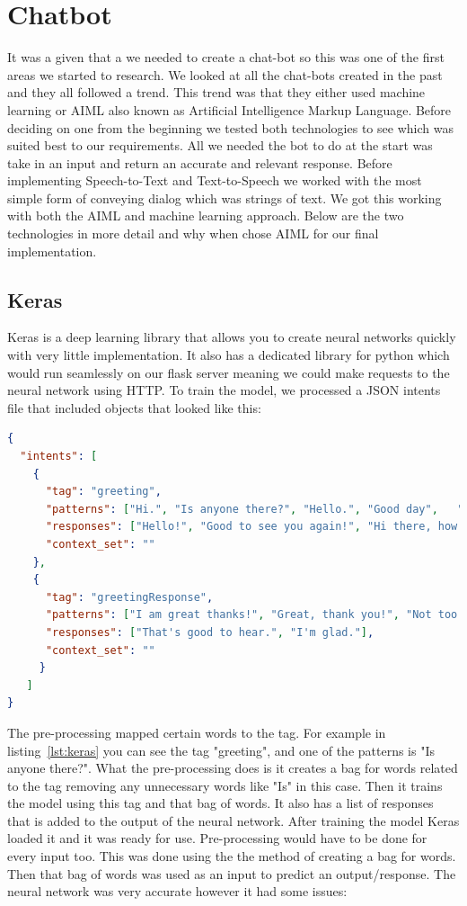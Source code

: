 \section{Chatbot}
It was a given that a we needed to create a chat-bot so this was one of the first areas we started to research. We looked at all the chat-bots created in the past and they all followed a trend. This trend was that they either used machine learning or AIML also known as Artificial Intelligence Markup Language. Before deciding on one from the beginning we tested both technologies to see which was suited best to our requirements. All we needed the bot to do at the start was take in an input and return an accurate and relevant response. Before implementing Speech-to-Text and Text-to-Speech we worked with the most simple form of conveying dialog which was strings of text. We got this working with both the AIML and machine learning approach. Below are the two technologies in more detail and why when chose AIML for our final implementation.

\subsection{Keras}
Keras is a deep learning library that allows you to create neural networks quickly with very little implementation\cite{chollet2018keras}. It also has a dedicated library for python which would run seamlessly on our flask server meaning we could make requests to the neural network using HTTP. To train the model, we processed a JSON intents file that included objects that looked like this:\cite{18Python81:online}

\begin{lstlisting}[caption={Keras training data example.},label={lst:keras}, language=JSON]
{
  "intents": [
    {
      "tag": "greeting",
      "patterns": ["Hi.", "Is anyone there?", "Hello.", "Good day",   "Whats up?"],
      "responses": ["Hello!", "Good to see you again!", "Hi there, how  can I help?"],
      "context_set": ""
    },
    {
      "tag": "greetingResponse",
      "patterns": ["I am great thanks!", "Great, thank you!", "Not too bad!"], 
      "responses": ["That's good to hear.", "I'm glad."],
      "context_set": ""
     }
   ]
}
\end{lstlisting}

The pre-processing mapped certain words to the tag. For example in listing~\ref{lst:keras} you can see the tag "greeting", and one of the patterns is "Is anyone there?". What the pre-processing does is it creates a bag for words related to the tag removing any unnecessary words like "Is" in this case. Then it trains the model using this tag and that bag of words. It also has a list of responses that is added to the output of the neural network. After training the model Keras loaded it and it was ready for use. Pre-processing would have to be done for every input too. This was done using the the method of creating a bag for words. Then that bag of words was used as an input to predict an output/response. The neural network was very accurate however it had some issues:

